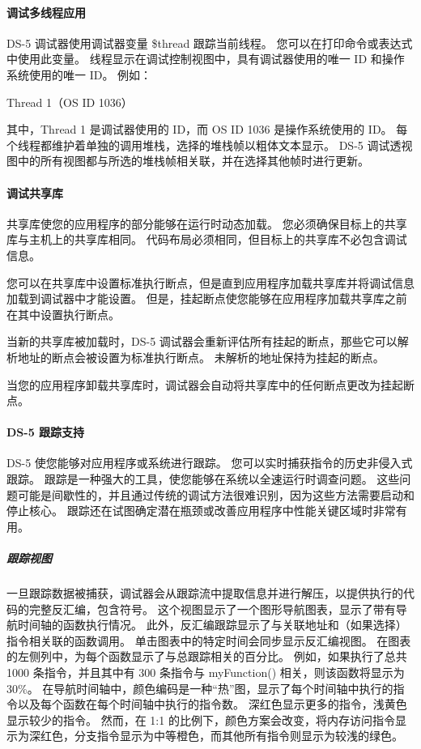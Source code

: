 \paragraph*{调试多线程应用}

DS-5 调试器使用调试器变量 \$thread 跟踪当前线程。
您可以在打印命令或表达式中使用此变量。
线程显示在调试控制视图中，具有调试器使用的唯一 ID 和操作系统使用的唯一 ID。
例如：

Thread 1（OS ID 1036）

其中，Thread 1 是调试器使用的 ID，而 OS ID 1036 是操作系统使用的 ID。
每个线程都维护着单独的调用堆栈，选择的堆栈帧以粗体文本显示。
DS-5 调试透视图中的所有视图都与所选的堆栈帧相关联，并在选择其他帧时进行更新。


\paragraph*{调试共享库}

共享库使您的应用程序的部分能够在运行时动态加载。
您必须确保目标上的共享库与主机上的共享库相同。
代码布局必须相同，但目标上的共享库不必包含调试信息。

您可以在共享库中设置标准执行断点，但是直到应用程序加载共享库并将调试信息加载到调试器中才能设置。
但是，挂起断点使您能够在应用程序加载共享库之前在其中设置执行断点。

当新的共享库被加载时，DS-5 调试器会重新评估所有挂起的断点，那些它可以解析地址的断点会被设置为标准执行断点。
未解析的地址保持为挂起的断点。

当您的应用程序卸载共享库时，调试器会自动将共享库中的任何断点更改为挂起断点。

\paragraph*{DS-5 跟踪支持}

DS-5 使您能够对应用程序或系统进行跟踪。
您可以实时捕获指令的历史非侵入式跟踪。
跟踪是一种强大的工具，使您能够在系统以全速运行时调查问题。
这些问题可能是间歇性的，并且通过传统的调试方法很难识别，因为这些方法需要启动和停止核心。
跟踪还在试图确定潜在瓶颈或改善应用程序中性能关键区域时非常有用。

\subparagraph*{跟踪视图}

一旦跟踪数据被捕获，调试器会从跟踪流中提取信息并进行解压，以提供执行的代码的完整反汇编，包含符号。
这个视图显示了一个图形导航图表，显示了带有导航时间轴的函数执行情况。
此外，反汇编跟踪显示了与关联地址和（如果选择）指令相关联的函数调用。
单击图表中的特定时间会同步显示反汇编视图。
在图表的左侧列中，为每个函数显示了与总跟踪相关的百分比。
例如，如果执行了总共 1000 条指令，并且其中有 300 条指令与 myFunction() 相关，则该函数将显示为 30\%。
在导航时间轴中，颜色编码是一种``热''图，显示了每个时间轴中执行的指令以及每个函数在每个时间轴中执行的指令数。
深红色显示更多的指令，浅黄色显示较少的指令。
然而，在 1:1 的比例下，颜色方案会改变，将内存访问指令显示为深红色，分支指令显示为中等橙色，而其他所有指令则显示为较浅的绿色。

